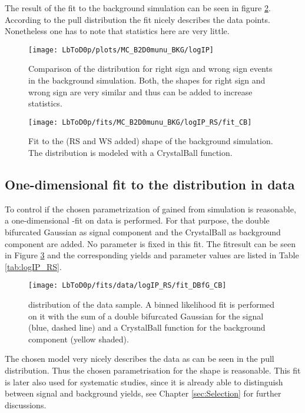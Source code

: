 The result of the fit to the background simulation can be seen in figure \ref{fig:fit_logIP_MC_BKG}.
According to the pull distribution the fit nicely describes the data points.
Nonetheless one has to note that statistics here are very little.
\begin{figure}[hptb]
    \centering
	\texttt{[image: LbToD0p/plots/MC\_B2D0munu\_BKG/logIP]}
	\caption{Comparison of the \logIP distribution for right sign and wrong sign events in the background simulation. Both, the shapes for right sign and wrong sign are very similar and thus can be added to increase statistics.}
    \label{fig:plot_logIP_MC_BKG}
\end{figure}
\begin{figure}[hptb]
    \centering
	\texttt{[image: LbToD0p/fits/MC\_B2D0munu\_BKG/logIP\_RS/fit\_CB]}
	\caption{Fit to the (RS and WS added) \logIP shape of the background simulation.
             The distribution is modeled with a CrystalBall function.}
    \label{fig:fit_logIP_MC_BKG}
\end{figure}

\subsection{One-dimensional fit to the \logIP distribution in data}
\label{sec:ControlLogIP}
To control if the chosen parametrization of \logIP gained from simulation is reasonable, a one-dimensional \logIP-fit on data is performed.
For that purpose, the double bifurcated Gaussian as signal component and the CrystalBall as background component are added.
No parameter is fixed in this fit.
The fitresult can be seen in Figure \ref{fig:fit_logIP_RS} and the corresponding yields and parameter values are listed in Table \ref{tab:logIP_RS}.
\begin{figure}[hptb]
    \centering
	\texttt{[image: LbToD0p/fits/data/logIP\_RS/fit\_DBfG\_CB]}
	\caption{\logIP distribution of the data sample.
             A binned likelihood fit is performed on it with the sum of a double bifurcated Gaussian for the signal (blue, dashed line) and a CrystalBall function for the background component (yellow shaded). }
    \label{fig:fit_logIP_RS}
\end{figure}


The chosen model very nicely describes the data as can be seen in the pull distribution.
Thus the chosen parametrisation for the \logIP shape is reasonable.
This fit is later also used for systematic studies, since it is already able to distinguish between signal and background yields, see Chapter \ref{sec:Selection} for further discussions.

